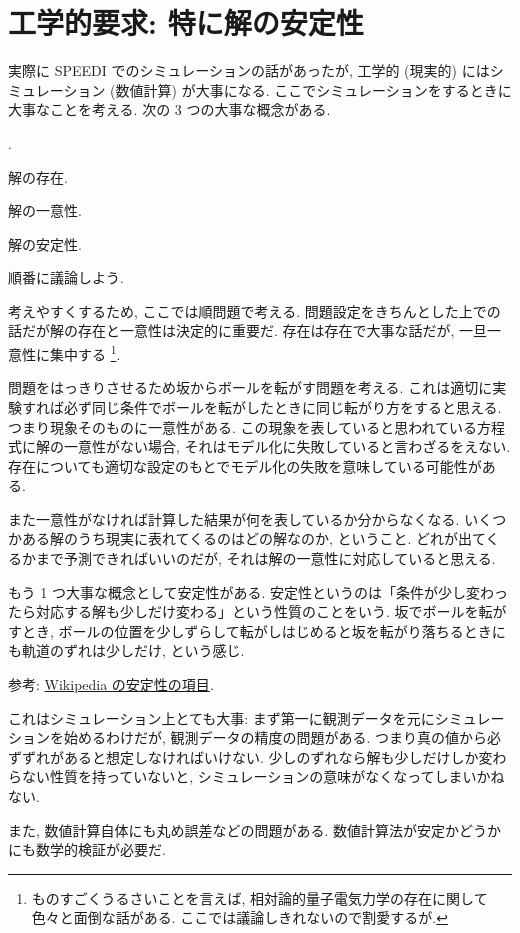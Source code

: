 \documentclass[openany, a4paper, oneside]{book}
\newcounter{enum2}
\renewenvironment{enumerate}{%
\begin{list}%
{%
\arabic{enum2}.\ \,%
}%
{%
\usecounter{enum2}
\setlength{\itemindent}{0pt}%
\setlength{\leftmargin}{6pt}%
\setlength{\rightmargin}{0pt}%
\setlength{\labelsep}{0pt}%
\setlength{\labelwidth}{6pt}%
\setlength{\itemsep}{0pt}%
\setlength{\parsep}{0pt}%
\setlength{\listparindent}{0pt}%
}
}{%
\end{list}%
}
\theoremstyle{break}
\theoremstyle{breakdefn}
\begin{document}
\section{工学的要求: 特に解の安定性}
\label{sec-7-9-8}

実際に SPEEDI でのシミュレーションの話があったが, 工学的 (現実的) にはシミュレーション (数値計算) が大事になる.
ここでシミュレーションをするときに大事なことを考える.
次の 3 つの大事な概念がある.
\begin{enumerate}
\item 解の存在.
\item 解の一意性.
\item 解の安定性.
\end{enumerate}
順番に議論しよう.

考えやすくするため, ここでは順問題で考える.
問題設定をきちんとした上での話だが解の存在と一意性は決定的に重要だ.
存在は存在で大事な話だが, 一旦一意性に集中する \footnote{ものすごくうるさいことを言えば, 相対論的量子電気力学の存在に関して色々と面倒な話がある. ここでは議論しきれないので割愛するが.
 }.

問題をはっきりさせるため坂からボールを転がす問題を考える.
これは適切に実験すれば必ず同じ条件でボールを転がしたときに同じ転がり方をすると思える.
つまり現象そのものに一意性がある.
この現象を表していると思われている方程式に解の一意性がない場合,
それはモデル化に失敗していると言わざるをえない.
存在についても適切な設定のもとでモデル化の失敗を意味している可能性がある.

また一意性がなければ計算した結果が何を表しているか分からなくなる.
いくつかある解のうち現実に表れてくるのはどの解なのか, ということ.
どれが出てくるかまで予測できればいいのだが, それは解の一意性に対応していると思える.

もう 1 つ大事な概念として安定性がある.
安定性というのは「条件が少し変わったら対応する解も少しだけ変わる」という性質のことをいう.
坂でボールを転がすとき,
ボールの位置を少しずらして転がしはじめると坂を転がり落ちるときにも軌道のずれは少しだけ, という感じ.

参考: \href{http://ja.wikipedia.org/wiki/%E5%AE%89%E5%AE%9A%E6%80%A7%E7%90%86%E8%AB%96}{Wikipedia の安定性の項目}.

これはシミュレーション上とても大事:
まず第一に観測データを元にシミュレーションを始めるわけだが,
観測データの精度の問題がある.
つまり真の値から必ずずれがあると想定しなければいけない.
少しのずれなら解も少しだけしか変わらない性質を持っていないと,
シミュレーションの意味がなくなってしまいかねない.

また, 数値計算自体にも丸め誤差などの問題がある.
数値計算法が安定かどうかにも数学的検証が必要だ.
\end{document}
